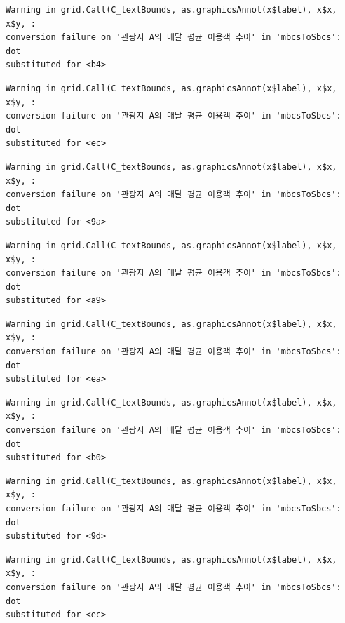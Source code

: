 \documentclass[
  letterpaper,
  DIV=11,
  numbers=noendperiod]{scrreprt}
\begin{document}
\begin{verbatim}
Warning in grid.Call(C_textBounds, as.graphicsAnnot(x$label), x$x, x$y, :
conversion failure on '관광지 A의 매달 평균 이용객 추이' in 'mbcsToSbcs': dot
substituted for <b4>
\end{verbatim}

\begin{verbatim}
Warning in grid.Call(C_textBounds, as.graphicsAnnot(x$label), x$x, x$y, :
conversion failure on '관광지 A의 매달 평균 이용객 추이' in 'mbcsToSbcs': dot
substituted for <ec>
\end{verbatim}

\begin{verbatim}
Warning in grid.Call(C_textBounds, as.graphicsAnnot(x$label), x$x, x$y, :
conversion failure on '관광지 A의 매달 평균 이용객 추이' in 'mbcsToSbcs': dot
substituted for <9a>
\end{verbatim}

\begin{verbatim}
Warning in grid.Call(C_textBounds, as.graphicsAnnot(x$label), x$x, x$y, :
conversion failure on '관광지 A의 매달 평균 이용객 추이' in 'mbcsToSbcs': dot
substituted for <a9>
\end{verbatim}

\begin{verbatim}
Warning in grid.Call(C_textBounds, as.graphicsAnnot(x$label), x$x, x$y, :
conversion failure on '관광지 A의 매달 평균 이용객 추이' in 'mbcsToSbcs': dot
substituted for <ea>
\end{verbatim}

\begin{verbatim}
Warning in grid.Call(C_textBounds, as.graphicsAnnot(x$label), x$x, x$y, :
conversion failure on '관광지 A의 매달 평균 이용객 추이' in 'mbcsToSbcs': dot
substituted for <b0>
\end{verbatim}

\begin{verbatim}
Warning in grid.Call(C_textBounds, as.graphicsAnnot(x$label), x$x, x$y, :
conversion failure on '관광지 A의 매달 평균 이용객 추이' in 'mbcsToSbcs': dot
substituted for <9d>
\end{verbatim}

\begin{verbatim}
Warning in grid.Call(C_textBounds, as.graphicsAnnot(x$label), x$x, x$y, :
conversion failure on '관광지 A의 매달 평균 이용객 추이' in 'mbcsToSbcs': dot
substituted for <ec>
\end{verbatim}
\end{document}
